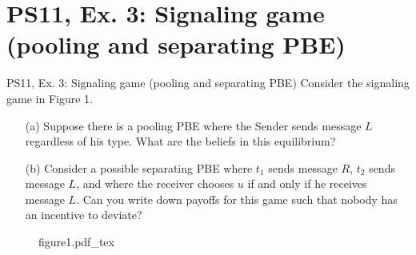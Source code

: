 \section{PS11, Ex. 3: Signaling game (pooling and separating PBE)}

\begin{frame}{PS11, Ex. 3: Signaling game (pooling and separating PBE)}
    Consider the signaling game in Figure 1.
    \begin{itemize}
      \item[(a)] Suppose there is a pooling PBE where the Sender sends message $L$ regardless of his type. What are the beliefs in this equilibrium?
      \item[(b)] Consider a possible separating PBE where $t_1$ sends message $R$, $t_2$ sends message $L$, and where the receiver chooses $u$ if and only if he receives message $L$. Can you write down payoffs for this game such that nobody has an incentive to deviate?
    \end{itemize} \vspace{-8pt}
    \begin{multicols}{2}
      \vfill\null\columnbreak
      \begin{figure}[!h]
        \center
        \def\svgwidth{\columnwidth}
        {figure1.pdf_tex}
      \end{figure}
      \vfill\null \columnbreak
      \vfill
    \end{multicols}
\end{frame}


